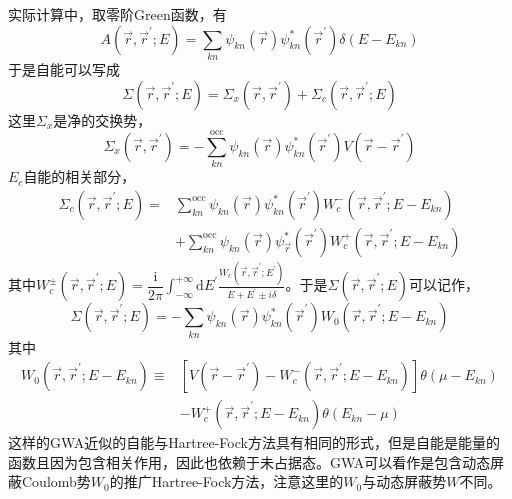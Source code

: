 实际计算中，取零阶Green函数，有
\begin{equation}
  A(\vec r,\vec r^{\prime};E)=\sum_{kn}\psi_{kn}(\vec r)\psi_{kn}^{\ast}(\vec r^{\prime})\delta(E-E_{kn})
  \label{eq:solid-235}
\end{equation}
于是自能可以写成
\begin{equation}
  \Sigma(\vec r,\vec r^{\prime};E)=\Sigma_x(\vec r,\vec r^{\prime})+\Sigma_c(\vec r,\vec r^{\prime};E)
  \label{eq:solid-236}
\end{equation}
这里$\Sigma_x$是净的交换势，
\begin{equation}
	\Sigma_x(\vec r,\vec r^{\prime})=-\sum_{kn}^{\mathrm{occ}}\psi_{kn}(\vec r)\psi_{kn}^{\ast}(\vec r^{\prime})V(\vec r-\vec r^{\prime})
  \label{eq:solid-254}
\end{equation}
$E_c$自能的相关部分，
\begin{equation}
  \begin{split}
	  \Sigma_c(\vec r,\vec r^{\prime};E)=&\sum_{kn}^{\mathrm{occ}}\psi_{kn}(\vec r)\psi_{kn}^{\ast}(\vec r^{\prime})W_c^-(\vec r,\vec r^{\prime};E-E_{kn})\\
	  &+\sum_{kn}^{\mathrm{occ}}\psi_{kn}(\vec r)\psi_{\vec r}^{\ast}(\vec r^{\prime})W_c^+(\vec r,\vec r^{\prime};E-E_{kn})
  \end{split}
  \label{eq:solid-237}
\end{equation}
其中$W_c^{\pm}(\vec r,\vec r^{\prime};E)=\dfrac{\mathrm{i}}{2\pi}\int_{-\infty}^{+\infty}\mathrm{d}E^{\prime}\frac{W_c(\vec r,\vec r^{\prime};E^{\prime})}{E+E^{\prime}\pm i\delta}$。于是$\Sigma(\vec r,\vec r^{\prime};E)$可以记作\cite{JPCM9-767_1997}，
\begin{displaymath}
  \Sigma(\vec r,\vec r^{\prime};E)=-\sum_{kn}\psi_{kn}(\vec r)\psi_{kn}^{\ast}(\vec r^{\prime})W_0(\vec r,\vec r^{\prime};E-E_{kn})
\end{displaymath}
其中
\begin{displaymath}
  \begin{aligned}
    W_0(\vec r,\vec r^{\prime};E-E_{kn})\equiv&[V(\vec r-\vec r^{\prime})-W_c^-(\vec r,\vec r^{\prime};E-E_{kn})]\theta(\mu-E_{kn})\\
    &-W_c^+(\vec r,\vec r^{\prime};E-E_{kn})\theta(E_{kn}-\mu)
  \end{aligned}
\end{displaymath}
这样的GWA近似的自能与Hartree-Fock方法具有相同的形式，但是自能是能量的函数且因为包含相关作用，因此也依赖于未占据态。GWA可以看作是包含动态屏蔽Coulomb势$W_0$的推广Hartree-Fock方法，注意这里的$W_0$与动态屏蔽势$W$不同。

